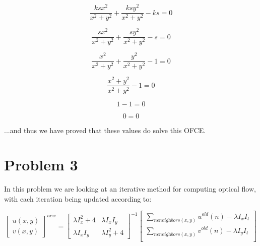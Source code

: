 \documentclass{article}
\begin{document}
\begin{equation}
    \frac{ksx^2 }{x^2 +y^2 }+\frac{ksy^2 }{x^2 +y^2 }-ks=0
\end{equation}

\begin{equation}
    \frac{sx^2 }{x^2 +y^2 }+\frac{sy^2 }{x^2 +y^2 }-s=0
\end{equation}

\begin{equation}
    \frac{x^2 }{x^2 +y^2 }+\frac{y^2 }{x^2 +y^2 }-1=0
\end{equation}

\begin{equation}
    \frac{x^2 +y^2}{x^2 +y^2 } - 1 =0
\end{equation}

\begin{equation}
    1 - 1 = 0
\end{equation}

\begin{equation}
    0 = 0
\end{equation}

\noindent ...and thus we have proved that these values do solve this OFCE.

\section*{Problem 3}

In this problem we are looking at an iterative method for computing optical flow, with each iteration being updated according to:

\begin{equation}
    \begin{bmatrix}
        u(x,y) \\
        v(x,y)
    \end{bmatrix}^{new} =
    \begin{bmatrix}
        \lambda I_x^2 + 4 & \lambda I_x I_y \\
        \lambda I_x I_y & \lambda I_y^2 + 4
    \end{bmatrix}^{-1}
    \begin{bmatrix}
        \sum_{n\epsilon \textit{neighbors}(x,y)} u^{old}(n)-\lambda I_x I_t \\
        \sum_{n\epsilon \textit{neighbors}(x,y)} v^{old}(n)-\lambda I_y I_t \\
    \end{bmatrix}
\end{equation}
\end{document}
